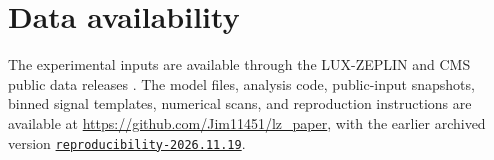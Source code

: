 \documentclass[aps,prd,reprint,superscriptaddress,longbibliography,floatfix]{revtex4-2}
\begin{document}
\section*{Data availability}
\label{data-availability}

The experimental inputs are available through the LUX-ZEPLIN and CMS
public data releases
\cite{lzdata,cmscovariance,cmsyields,cmssignal,cmscutflow}. The
model files, analysis code, public-input snapshots, binned signal
templates, numerical scans, and reproduction instructions are available
at \url{https://github.com/Jim11451/lz_paper}, with the earlier archived version
\href{https://github.com/Jim11451/lz_paper/tree/reproducibility-2026.11.19}{\texttt{reproducibility-2026.11.19}}.

\clearpage

\clearpage

\end{document}
